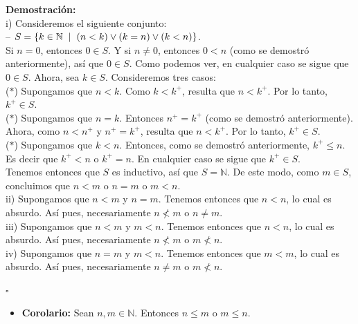 \documentclass[10 pt]{article}
\begin{document}
\Large{\textbf{Demostración:} \\

i) Consideremos el siguiente conjunto: \\

-- $S=\{k \in \mathbb N \hspace{0.2 cm}|\hspace{0.2 cm}(n<k) \lor (k=n) \lor (k<n) \}$. \\

Si $n=0$, entonces $0 \in S$. Y si $n \neq 0$, entonces $0<n$ (como se demostró anteriormente), así que $0 \in S$. Como podemos ver, en cualquier caso se sigue que $0 \in S$. Ahora, sea $k \in S$. Consideremos tres casos: \\

($\ast$) Supongamos que $n<k$. Como $k<k^+$, resulta que $n<k^+$. Por lo tanto, $k^+ \in S$. \\

($\ast$) Supongamos que $n=k$. Entonces $n^+=k^+$ (como se demostró anteriormente). Ahora, como $n<n^+$ y $n^+=k^+$, resulta que $n<k^+$. Por lo tanto, $k^+ \in S$. \\

($\ast$) Supongamos que $k<n$. Entonces, como se demostró anteriormente, $k^+ \leq n$. Es decir que $k^+<n$ o $k^+=n$. En cualquier caso se sigue que $k^+ \in S$. \\

Tenemos entonces que $S$ es inductivo, así que $S=\mathbb N$. De este modo, como $m \in S$, concluimos que $n<m$ o $n=m$ o $m<n$. \\ 

ii) Supongamos que $n<m$ y $n=m$. Tenemos entonces que $n<n$, lo cual es absurdo. Así pues, necesariamente $n \nless m$ o $n \neq m$. \\

iii) Supongamos que $n<m$ y $m<n$. Tenemos entonces que $n<n$, lo cual es absurdo. Así pues, necesariamente $n \nless m$ o $m \nless n$. \\

iv) Supongamos que $n=m$ y $m<n$. Tenemos entonces que $m<m$, lo cual es absurdo. Así pues, necesariamente $n \neq m$ o $m \nless n$.} \\

\begin{flushright}
    $\square$
\end{flushright}

\begin{itemize}
    \item \Large{\textbf{Corolario:} Sean $n,m \in \mathbb N$. Entonces $n \leq m$ o $m \leq n$.} \\
\end{itemize}
\end{document}
